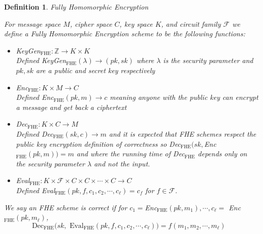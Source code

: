 \documentclass[12pt,twoside]{reedthesis}
\newtheorem{definition}{Definition}
\newcommand{\dec}[0]{\text{Dec}}
\newcommand{\Z}[0]{\mathbb{Z}}
\begin{document}
    \begin{definition}{Fully Homomorphic Encryption}
    \par For message space $M$, cipher space $C$, key space $K$, and circuit family $\mathcal{F}$ we define a Fully Homomorphic Encryption scheme to be the following functions:
     
     \newcommand{\fhe}[0]{_\text{FHE}}
     
     \begin{itemize}
     \item KeyGen$_\text{FHE}:\Z \to K \times K$ \\
     Defined KeyGen$_\text{FHE}(\lambda)\to (pk,sk)$ where $\lambda$ is the security parameter and $pk,sk$ are a public and secret key respectively 
     \item Enc$_\text{FHE}:K \times M\to C$ \\
     Defined Enc$_\text{FHE}(pk,m) \to c$ meaning anyone with the public key can encrypt a message and get back a ciphertext
     \item Dec$_\text{FHE}:K \times C \to M$ \\
     Defined Dec$_\text{FHE}(sk,c) \to m$ and it is expected that FHE schemes respect the public key encryption definition of correctness so Dec$_\text{FHE}(sk,$Enc$_\text{FHE}(pk,m))=m$ and where the running time of Dec$_\text{FHE}$ depends only on the security parameter $\lambda$ and not the input.
     \item Eval$_\text{FHE}:K \times \mathcal{F} \times C \times C \times \cdots \times C \to C$ \\
     Defined Eval$\fhe(pk,f,c_1,c_2,\cdots,c_\ell) = c_f$ for $f\in \mathcal{F}$.
    \end{itemize}
    \par We say an FHE scheme is correct if for $c_1 =$Enc$\fhe(pk,m_1), \cdots, c_\ell =$ Enc$\fhe(pk,m_\ell)$,
    $$\text{$\dec_\text{FHE}(sk,$ Eval$\fhe(pk,f,c_1,c_2, \cdots, c_\ell)) = f(m_1,m_2,\cdots,m_\ell)$ }$$ 
    \end{definition}
    
\end{document}
